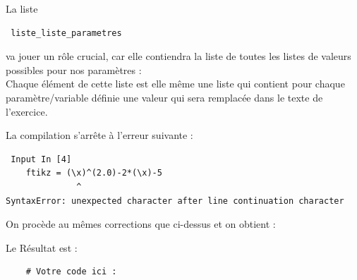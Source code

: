 {\begin{dsxl} La liste
 \begin{verbatim}
 liste_liste_parametres
\end{verbatim}
va jouer un rôle crucial, car elle contiendra la liste de toutes les listes de valeurs possibles pour nos paramètres : \\
Chaque élément de cette liste est elle même une liste qui contient pour chaque paramètre/variable définie une valeur qui sera remplacée dans le texte de l'exercice. 
\end{dsxl}

La compilation s'arrête à l'erreur suivante : 

\begin{verbatim}
 Input In [4]
    ftikz = (\x)^(2.0)-2*(\x)-5
              ^
SyntaxError: unexpected character after line continuation character
\end{verbatim}

On procède au mêmes corrections que ci-dessus et on obtient : 

Le Résultat est :
\begin{verbatim}
    # Votre code ici :


\end{verbatim}}
